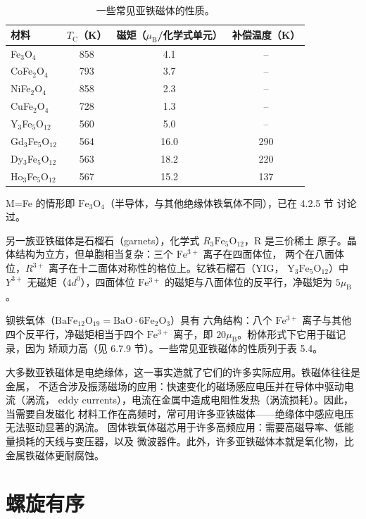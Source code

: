 \begin{table}
\centering
\caption{一些常见亚铁磁体的性质。}
\begin{small}
\begin{tabular}{lccc}
\toprule
材料 & $T_{\mathrm{C}}$（K） & 磁矩（$\mu_{\mathrm{B}}$/化学式单元） & 补偿温度（K）\\
\midrule
Fe$_3$O$_4$ & 858 & 4.1 & --\\
CoFe$_2$O$_4$ & 793 & 3.7 & --\\
NiFe$_2$O$_4$ & 858 & 2.3 & --\\
CuFe$_2$O$_4$ & 728 & 1.3 & --\\
Y$_3$Fe$_5$O$_12$ & 560 & 5.0 & --\\
Gd$_3$Fe$_5$O$_12$ & 564 & 16.0 & 290\\
Dy$_3$Fe$_5$O$_12$ & 563 & 18.2 & 220\\
Ho$_3$Fe$_5$O$_12$ & 567 & 15.2 & 137\\
\bottomrule
\end{tabular}
\end{small}
\end{table}

M=Fe 的情形即 $\mathrm{Fe_3O_4}$（半导体，与其他绝缘体铁氧体不同），已在 4.2.5 节
讨论过。

另一族亚铁磁体是石榴石（garnets），化学式 $R_3\mathrm{Fe_5O_{12}}$，R 是三价稀土
原子。晶体结构为立方，但单胞相当复杂：三个 $\mathrm{Fe^{3+}}$ 离子在四面体位，
两个在八面体位，$R^{3+}$ 离子在十二面体对称性的格位上。钇铁石榴石（YIG，
$\mathrm{Y_3Fe_5O_{12}}$）中 $Y^{3+}$ 无磁矩（$4d^{0}$），四面体位 $\mathrm{Fe^{3+}}$
的磁矩与八面体位的反平行，净磁矩为 $5\mu_{\mathrm{B}}$。

钡铁氧体（$\mathrm{BaFe_{12}O_{19}}=\mathrm{BaO}\cdot6\mathrm{Fe_2O_3}$）具有
六角结构：八个 $\mathrm{Fe^{3+}}$ 离子与其他四个反平行，净磁矩相当于四个
$\mathrm{Fe^{3+}}$ 离子，即 $20\mu_{\mathrm{B}}$。粉体形式下它用于磁记录，因为
矫顽力高（见 6.7.9 节）。一些常见亚铁磁体的性质列于表 5.4。

大多数亚铁磁体是电绝缘体，这一事实造就了它们的许多实际应用。铁磁体往往是金属，
不适合涉及振荡磁场的应用：快速变化的磁场感应电压并在导体中驱动电流（涡流，
eddy currents），电流在金属中造成电阻性发热（涡流损耗）。因此，当需要自发磁化
材料工作在高频时，常可用许多亚铁磁体——绝缘体中感应电压无法驱动显著的涡流。
固体铁氧体磁芯用于许多高频应用：需要高磁导率、低能量损耗的天线与变压器，以及
微波器件。此外，许多亚铁磁体本就是氧化物，比金属铁磁体更耐腐蚀。

\section{螺旋有序}

